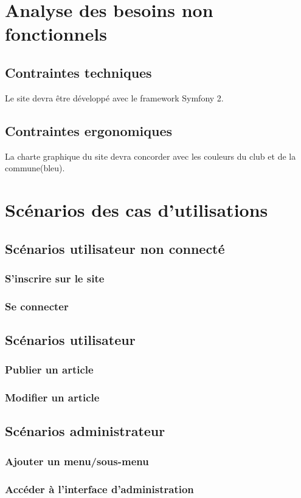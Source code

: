 \documentclass[a4paper,11pt]{report}
\begin{document}
\chapter{Analyse des besoins non fonctionnels}
\section{Contraintes techniques}
Le site devra être développé avec le framework Symfony 2.
\section{Contraintes ergonomiques}
La charte graphique du site devra concorder avec les couleurs du club et de la commune(bleu).

\chapter{Scénarios des cas d'utilisations}
\section{Scénarios utilisateur non connecté}
\subsection{S'inscrire sur le site}
\subsection{Se connecter}
\section{Scénarios utilisateur}
\subsection{Publier un article}
\subsection{Modifier un article}
\section{Scénarios administrateur}
\subsection{Ajouter un menu/sous-menu}
\subsection{Accéder à l'interface d'administration}
\end{document}
